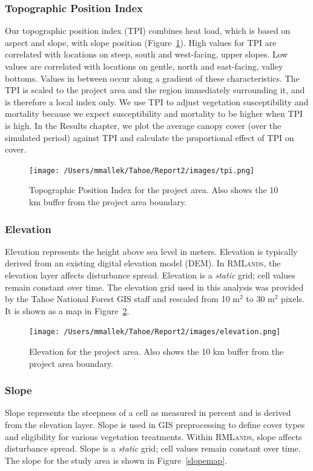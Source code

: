 \subsubsection{Topographic Position Index}
Our topographic position index (TPI) combines heat load, which is based on aspect and slope, with slope position (Figure~\ref{tpimap}). High values for TPI are correlated with locations on steep, south and west-facing, upper slopes. Low values are correlated with locations on gentle, north and east-facing, valley bottoms. Values in between occur along a gradient of these characteristics. The TPI is scaled to the project area and the region immediately surrounding it, and is therefore a local index only. We use TPI to adjust vegetation susceptibility and mortality because we expect susceptibility and mortality to be higher when TPI is high. In the Results chapter, we plot the average canopy cover (over the simulated period) against TPI and calculate the proportional effect of TPI on cover.

\begin{figure}[htbp]
\centering
\texttt{[image: /Users/mmallek/Tahoe/Report2/images/tpi.png]}
\caption{Topographic Position Index for the project area. Also shows the 10 km buffer from the project area boundary.} 
\label{tpimap}
\end{figure}

\subsubsection{Elevation} 
Elevation represents the height above sea level in meters. Elevation is typically derived from an existing digital elevation model (DEM). In \textsc{RMLands}, the elevation layer affects disturbance spread.  Elevation is a \emph{static} grid; cell values remain constant over time. The elevation grid used in this analysis was provided by the Tahoe National Forest GIS staff and rescaled from 10 m$^2$ to 30 m$^2$ pixels. It is shown as a map in Figure~\ref{elevationmap}.

\begin{figure}[htbp]
\centering
\texttt{[image: /Users/mmallek/Tahoe/Report2/images/elevation.png]}
\caption{Elevation for the project area. Also shows the 10 km buffer from the project area boundary.} 
\label{elevationmap}
\end{figure}

\subsubsection{Slope} 
Slope represents the steepness of a cell as measured in percent and is derived from the elevation layer. Slope is used in GIS preprocessing to define cover types and eligibility for various vegetation treatments. Within \textsc{RMLands}, slope affects disturbance spread. Slope is a \emph{static} grid; cell values remain constant over time. The slope for the study area is shown in Figure~\ref{slopemap}.

